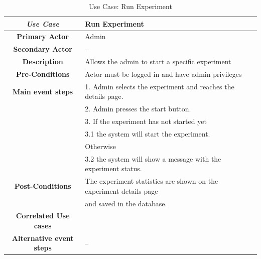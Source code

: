 \begin{table}[ht!]
    \centering
    \caption{Use Case: Run Experiment}
    \begin{tabularx}{\textwidth}{|Sl|S{X}|}
        \hline
        \textbf{\textit{Use Case}}       & \textbf{Run Experiment}                                                     \\ \hline
        \textbf{Primary Actor}           & Admin                                                                       \\ \hline
        \textbf{Secondary Actor}         & --                                                                          \\ \hline
        \textbf{Description}             & Allows the admin to start a specific experiment                             \\ \hline
        \textbf{Pre-Conditions}          & Actor must be logged in and have admin privileges                           \\ \hline
        \textbf{Main event steps}        & 1. Admin selects the experiment and reaches the details page.               \\
                                         & 2. Admin presses the start button.                                          \\
                                         & 3. If the experiment has not started yet                                    \\
                                         & \hspace{1em} 3.1 the system will start the experiment.                      \\
                                         & Otherwise                                                                   \\
                                         & \hspace{1em} 3.2 the system will show a message with the experiment status. \\ \hline
        \textbf{Post-Conditions}         & The experiment statistics are shown on the experiment details page          \\
                                         & and saved in the database.                                                  \\ \hline
        \textbf{Correlated Use cases}    &                                                                             \\ \hline
        \textbf{Alternative event steps} & --                                                                          \\ \hline
    \end{tabularx}
\end{table}


